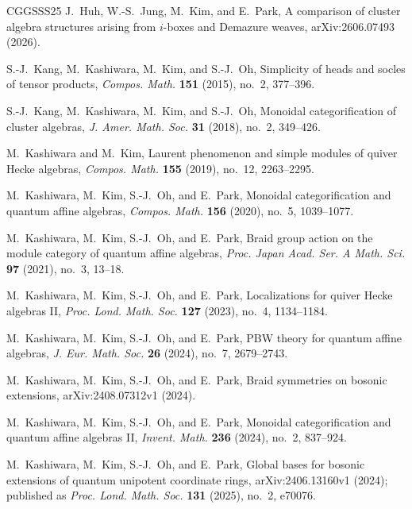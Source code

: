 \documentclass[12pt, reqno]{amsart}
\theoremstyle{plain}
\theoremstyle{definition}
\numberwithin{equation}{section}
\begin{document}
\begin{thebibliography}{CGGSSS25}
J.~Huh, W.-S.~Jung, M.~Kim, and E.~Park,
\newblock A comparison of cluster algebra structures arising from
\(i\)-boxes and Demazure weaves,
\newblock arXiv:2606.07493 (2026).

S.-J.~Kang, M.~Kashiwara, M.~Kim, and S.-J.~Oh,
\newblock Simplicity of heads and socles of tensor products,
\newblock \emph{Compos. Math.} \textbf{151} (2015), no.~2, 377--396.

S.-J.~Kang, M.~Kashiwara, M.~Kim, and S.-J.~Oh,
\newblock Monoidal categorification of cluster algebras,
\newblock \emph{J. Amer. Math. Soc.} \textbf{31} (2018), no.~2,
349--426.

M.~Kashiwara and M.~Kim,
\newblock Laurent phenomenon and simple modules of quiver Hecke algebras,
\newblock \emph{Compos. Math.} \textbf{155} (2019), no.~12, 2263--2295.

M.~Kashiwara, M.~Kim, S.-J.~Oh, and E.~Park,
\newblock Monoidal categorification and quantum affine algebras,
\newblock \emph{Compos. Math.} \textbf{156} (2020), no.~5, 1039--1077.

M.~Kashiwara, M.~Kim, S.-J.~Oh, and E.~Park,
\newblock Braid group action on the module category of quantum affine
algebras,
\newblock \emph{Proc. Japan Acad. Ser. A Math. Sci.} \textbf{97}
(2021), no.~3, 13--18.

M.~Kashiwara, M.~Kim, S.-J.~Oh, and E.~Park,
\newblock Localizations for quiver Hecke algebras II,
\newblock \emph{Proc. Lond. Math. Soc.} \textbf{127} (2023), no.~4,
1134--1184.

M.~Kashiwara, M.~Kim, S.-J.~Oh, and E.~Park,
\newblock PBW theory for quantum affine algebras,
\newblock \emph{J. Eur. Math. Soc.} \textbf{26} (2024), no.~7,
2679--2743.

M.~Kashiwara, M.~Kim, S.-J.~Oh, and E.~Park,
\newblock Braid symmetries on bosonic extensions,
\newblock arXiv:2408.07312v1 (2024).

M.~Kashiwara, M.~Kim, S.-J.~Oh, and E.~Park,
\newblock Monoidal categorification and quantum affine algebras II,
\newblock \emph{Invent. Math.} \textbf{236} (2024), no.~2, 837--924.

M.~Kashiwara, M.~Kim, S.-J.~Oh, and E.~Park,
\newblock Global bases for bosonic extensions of quantum unipotent
coordinate rings,
\newblock arXiv:2406.13160v1 (2024); published as
\newblock \emph{Proc. Lond. Math. Soc.} \textbf{131} (2025), no.~2,
e70076.


\end{thebibliography}
\end{document}
